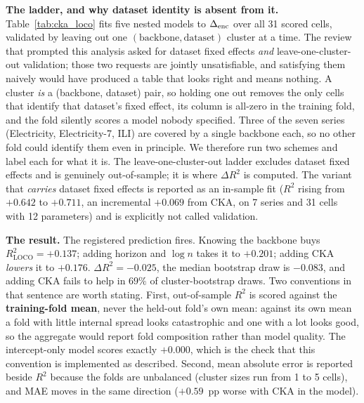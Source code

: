 \textbf{The ladder, and why dataset identity is absent from it.}
Table~\ref{tab:cka_loco} fits five nested models to $\Delta_\text{enc}$ over all 31 scored
cells, validated by leaving out one $(\text{backbone}, \text{dataset})$ cluster at
a time.  The review that prompted this analysis asked for dataset fixed effects
\emph{and} leave-one-cluster-out validation; those two requests are jointly
unsatisfiable, and satisfying them naively would have produced a table that looks
right and means nothing.  A cluster \emph{is} a (backbone, dataset) pair, so
holding one out removes the only cells that identify that dataset's fixed effect,
its column is all-zero in the training fold, and the fold silently scores a model
nobody specified.  Three of the seven series (Electricity, Electricity-7, ILI) are
covered by a single backbone each, so no other fold could identify them even in
principle.  We therefore run two schemes and label each for what it is.  The
leave-one-cluster-out ladder excludes dataset fixed effects and is genuinely
out-of-sample; it is where $\Delta R^2$ is computed.  The variant that
\emph{carries} dataset fixed effects is reported as an in-sample fit ($R^2$ rising
from $+0.642$ to $+0.711$, an incremental $+0.069$ from CKA, on 7 series and 31
cells with 12 parameters) and is explicitly not called validation.

\textbf{The result.}  The registered prediction fires.  Knowing the backbone buys
$R^2_\text{LOCO}{=}{+}0.137$; adding horizon and $\log n$ takes it to $+0.201$;
adding CKA \emph{lowers} it to $+0.176$.  $\Delta R^2{=}{-}0.025$, the median
bootstrap draw is $-0.083$, and adding CKA fails to help in $69\%$ of
cluster-bootstrap draws.  Two conventions in that sentence are worth stating.
First, out-of-sample $R^2$ is scored against the \textbf{training-fold mean},
never the held-out fold's own mean: against its own mean a fold with little
internal spread looks catastrophic and one with a lot looks good, so the aggregate
would report fold composition rather than model quality.  The intercept-only model
scores exactly $+0.000$, which is the check that this convention is implemented as
described.  Second, mean absolute error is reported beside $R^2$ because the folds
are unbalanced (cluster sizes run from 1 to 5 cells), and MAE moves in the same
direction ($+0.59$~pp worse with CKA in the model).

